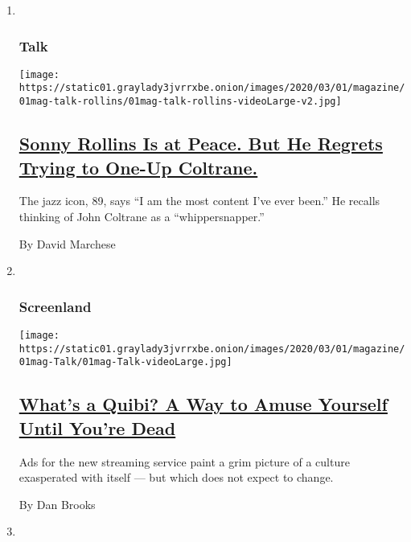 \begin{enumerate}
\def\labelenumi{\arabic{enumi}.}
\item ~
  \hypertarget{talk}{%
  \subsubsection{Talk}\label{talk}}

  \texttt{[image: https://static01.graylady3jvrrxbe.onion/images/2020/03/01/magazine/01mag-talk-rollins/01mag-talk-rollins-videoLarge-v2.jpg]}

  \hypertarget{sonny-rollins-is-at-peace-but-he-regrets-trying-to-one-up-coltrane}{%
  \subsection{\texorpdfstring{\href{/interactive/2020/02/24/magazine/sonny-rollins-interview.html}{Sonny
  Rollins Is at Peace. But He Regrets Trying to One-Up
  Coltrane.}}{Sonny Rollins Is at Peace. But He Regrets Trying to One-Up Coltrane.}}\label{sonny-rollins-is-at-peace-but-he-regrets-trying-to-one-up-coltrane}}

  The jazz icon, 89, says ``I am the most content I've ever been.'' He
  recalls thinking of John Coltrane as a ``whippersnapper.''

  By David Marchese
\item ~
  \hypertarget{screenland}{%
  \subsubsection{Screenland}\label{screenland}}

  \texttt{[image: https://static01.graylady3jvrrxbe.onion/images/2020/03/01/magazine/01mag-Talk/01mag-Talk-videoLarge.jpg]}

  \hypertarget{whats-a-quibi-a-way-to-amuse-yourself-until-youre-dead}{%
  \subsection{\texorpdfstring{\href{/2020/02/26/magazine/quibi-ad.html}{What's
  a Quibi? A Way to Amuse Yourself Until You're
  Dead}}{What's a Quibi? A Way to Amuse Yourself Until You're Dead}}\label{whats-a-quibi-a-way-to-amuse-yourself-until-youre-dead}}

  Ads for the new streaming service paint a grim picture of a culture
  exasperated with itself --- but which does not expect to change.

  By Dan Brooks
\item ~
  \hypertarget{diagnosis}{%
}
\end{enumerate}

